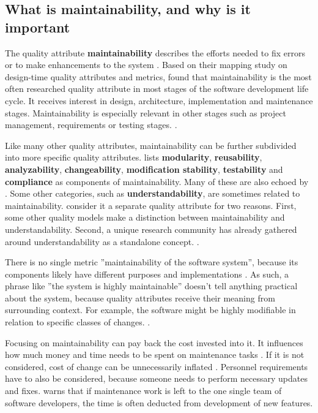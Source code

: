 \documentclass[utf8,english]{gradu3}
\begin{document}
\subsection{What is maintainability, and why is it important}

The quality attribute \textbf{maintainability} describes the efforts needed to fix errors
or to make enhancements to the system \parencite[603]{Gorla2010}. Based on their mapping
study on design-time quality attributes and metrics, \textcite{Arvanitou2017}
found that maintainability is the most often researched quality attribute in
most stages of the software development life cycle. It receives interest in
design, architecture, implementation and maintenance stages. Maintainability is
especially relevant in other stages such as project management, requirements or
testing stages. \parencite[61-62]{Arvanitou2017}.

Like many other quality attributes, maintainability can be further subdivided
into more specific quality attributes. \textcite[233]{ISO5055} lists \textbf{modularity},
\textbf{reusability}, \textbf{analyzability}, \textbf{changeability},
\textbf{modification stability}, \textbf{testability} and \textbf{compliance} as
components of maintainability. Many of these are also echoed
by \textcite[61]{Arvanitou2017}. Some other categories, such as \textbf{understandability}, are
sometimes related to maintainability. \textcite{Arvanitou2017} consider it a
separate quality attribute for two reasons. First, some other quality models
make a distinction between maintainability and understandability. Second, a
unique research community has already gathered around understandability as a
standalone concept. \parencite[61]{Arvanitou2017}.

There is no single metric ''maintainability of the software system'', because
its components likely have different purposes and implementations
\parencites[26]{Broy2006}[192]{Bass1998}. As such, a phrase like ''the system
is highly maintainable'' doesn't tell anything practical about the system,
because quality attributes receive their meaning from surrounding context. For
example, the software might be highly modifiable in relation to specific classes
of changes. \parencite[192]{Bass1998}.

Focusing on maintainability can pay back the cost invested into it. It
influences how much money and time needs to be spent on maintenance tasks
\parencite[21]{Broy2006}. If it is not considered, cost of change can be
unnecessarily inflated \parencite[2]{Vale2022}. Personnel requirements have to
also be considered, because someone needs to perform necessary updates and
fixes. \textcite{Heroku2011} warns that if maintenance work is left to the one single
team of software developers, the time is often deducted from development of new features.
\end{document}

